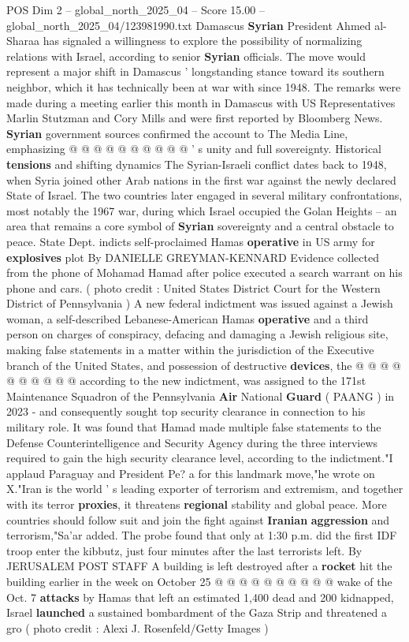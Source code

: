 \begin{textsample}{POS Dim 2 – global\_north\_2025\_04 – Score 15.00 – global\_north\_2025\_04/123981990.txt}
Damascus \textbf{Syrian} President Ahmed al-Sharaa has signaled a willingness to explore the possibility of normalizing relations with Israel, according to senior \textbf{Syrian} officials.
The move would represent a major shift in Damascus ' longstanding stance toward its southern neighbor, which it has technically been at war with since 1948.
The remarks were made during a meeting earlier this month in Damascus with US Representatives Marlin Stutzman and Cory Mills and were first reported by Bloomberg News. \textbf{Syrian} government sources confirmed the account to The Media Line, emphasizing @ @ @ @ @ @ @ @ @ @ ' s unity and full sovereignty.
Historical \textbf{tensions} and shifting dynamics The Syrian-Israeli conflict dates back to 1948, when Syria joined other Arab nations in the first war against the newly declared State of Israel.
The two countries later engaged in several military confrontations, most notably the 1967 war, during which Israel occupied the Golan Heights -- an area that remains a core symbol of \textbf{Syrian} sovereignty and a central obstacle to peace.
State Dept. indicts self-proclaimed Hamas \textbf{operative} in US army for \textbf{explosives} plot By DANIELLE GREYMAN-KENNARD Evidence collected from the phone of Mohamad Hamad after police executed a search warrant on his phone and cars. ( photo credit : United States District Court for the Western District of Pennsylvania ) A new federal indictment was issued against a Jewish woman, a self-described Lebanese-American Hamas \textbf{operative} and a third person on charges of conspiracy, defacing and damaging a Jewish religious site, making false statements in a matter within the jurisdiction of the Executive branch of the United States, and possession of destructive \textbf{devices}, the @ @ @ @ @ @ @ @ @ @ according to the new indictment, was assigned to the 171st Maintenance Squadron of the Pennsylvania \textbf{Air} National \textbf{Guard} ( PAANG ) in 2023 - and consequently sought top security clearance in connection to his military role.
It was found that Hamad made multiple false statements to the Defense Counterintelligence and Security Agency during the three interviews required to gain the high security clearance level, according to the indictment."I applaud Paraguay and President Pe? a for this landmark move,"he wrote on X."Iran is the world ' s leading exporter of terrorism and extremism, and together with its terror \textbf{proxies}, it threatens \textbf{regional} stability and global peace.
More countries should follow suit and join the fight against \textbf{Iranian} \textbf{aggression} and terrorism,"Sa'ar added.
The probe found that only at 1:30 p.m. did the first IDF troop enter the kibbutz, just four minutes after the last terrorists left.
By JERUSALEM POST STAFF A building is left destroyed after a \textbf{rocket} hit the building earlier in the week on October 25 @ @ @ @ @ @ @ @ @ @ wake of the Oct. 7 \textbf{attacks} by Hamas that left an estimated 1,400 dead and 200 kidnapped, Israel \textbf{launched} a sustained bombardment of the Gaza Strip and threatened a gro ( photo credit : Alexi J.
Rosenfeld/Getty Images )


\end{textsample}
